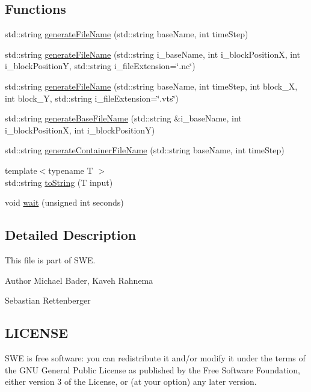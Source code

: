 \subsection*{Functions}
\begin{DoxyCompactItemize}
\item 
std\-::string \hyperlink{help_8hh_aa10dc278c6ac60f9cd49955cbe16fbcb}{generate\-File\-Name} (std\-::string base\-Name, int time\-Step)
\item 
std\-::string \hyperlink{help_8hh_a206f33ce37fa47f8635d02a1cfc9881f}{generate\-File\-Name} (std\-::string i\-\_\-base\-Name, int i\-\_\-block\-Position\-X, int i\-\_\-block\-Position\-Y, std\-::string i\-\_\-file\-Extension=\char`\"{}.nc\char`\"{})
\item 
std\-::string \hyperlink{help_8hh_ab05bce4e4d30d0b9fb85f81668f98f79}{generate\-File\-Name} (std\-::string base\-Name, int time\-Step, int block\-\_\-\-X, int block\-\_\-\-Y, std\-::string i\-\_\-file\-Extension=\char`\"{}.vts\char`\"{})
\item 
std\-::string \hyperlink{help_8hh_a7dc37444a6b7771aefff04a38e74e086}{generate\-Base\-File\-Name} (std\-::string \&i\-\_\-base\-Name, int i\-\_\-block\-Position\-X, int i\-\_\-block\-Position\-Y)
\item 
std\-::string \hyperlink{help_8hh_a427928180ec14bf889c55e5cc51d8e36}{generate\-Container\-File\-Name} (std\-::string base\-Name, int time\-Step)
\item 
{\footnotesize template$<$typename T $>$ }\\std\-::string \hyperlink{help_8hh_a7824e0dc9a06a7ab03df4c0bd0ddcd83}{to\-String} (T input)
\item 
void \hyperlink{help_8hh_a3db4e4545e5a3f2655ff1a749ca0ed6e}{wait} (unsigned int seconds)
\end{DoxyCompactItemize}


\subsection{Detailed Description}
This file is part of S\-W\-E.

\begin{DoxyAuthor}{Author}
Michael Bader, Kaveh Rahnema 

Sebastian Rettenberger
\end{DoxyAuthor}
\hypertarget{Writer_8hh_LICENSE}{}\subsection{L\-I\-C\-E\-N\-S\-E}\label{Writer_8hh_LICENSE}
S\-W\-E is free software\-: you can redistribute it and/or modify it under the terms of the G\-N\-U General Public License as published by the Free Software Foundation, either version 3 of the License, or (at your option) any later version.


